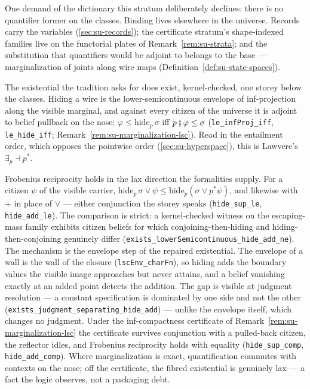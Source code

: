 One demand of the dictionary this stratum deliberately declines:
there is no quantifier former on the classes. Binding lives
elsewhere in the universe. Records carry the variables
(\autoref{sec:su-records}); the certificate stratum's
shape-indexed families live on the functorial plates of
Remark~\ref{rem:su-strata}; and the substitution that quantifiers
would be adjoint to belongs to the base --- marginalization of
joints along wire maps (Definition~\ref{def:su-state-spaces}).

The existential the tradition asks for does exist, kernel-checked,
one storey below the classes. Hiding a wire is the
lower-semicontinuous envelope of inf-projection along the visible
marginal, and against every citizen of the universe it is adjoint
to belief pullback on the nose:
$\varphi \le \mathrm{hide}_{p}\,\sigma$ iff
$p \fatsemi \varphi \le \sigma$ (\texttt{le\_infProj\_iff},
\texttt{le\_hide\_iff}; Remark~\ref{rem:su-marginalization-lsc}).
Read in the entailment order, which opposes the pointwise order
(\autoref{sec:su-hyperspace}), this is Lawvere's
$\exists_{p} \dashv p^{*}$.

Frobenius reciprocity holds in the lax direction the formalities
supply. For a citizen $\psi$ of the visible carrier,
$\mathrm{hide}_{p}\,\sigma \vee \psi \le
\mathrm{hide}_{p}(\sigma \vee p^{*}\psi)$, and likewise with $+$
in place of $\vee$ --- either conjunction the storey speaks
(\texttt{hide\_sup\_le}, \texttt{hide\_add\_le}). The comparison
is strict: a kernel-checked witness on the escaping-mass family
exhibits citizen beliefs for which conjoining-then-hiding and
hiding-then-conjoining genuinely differ
(\texttt{exists\_lowerSemicontinuous\_hide\_add\_ne}). The
mechanism is the envelope step of the repaired existential. The
envelope of a wall is the wall of the closure
(\texttt{lscEnv\_charFn}), so hiding adds the boundary values the
visible image approaches but never attains, and a belief
vanishing exactly at an added point detects the addition. The gap
is visible at judgment resolution --- a constant specification is
dominated by one side and not the other
(\texttt{exists\_judgment\_separating\_hide\_add}) --- unlike the
envelope itself, which changes no judgment. Under the
inf-compactness certificate of
Remark~\ref{rem:su-marginalization-lsc} the certificate survives
conjunction with a pulled-back citizen, the reflector idles, and
Frobenius reciprocity holds with equality
(\texttt{hide\_sup\_comp}, \texttt{hide\_add\_comp}). Where
marginalization is exact, quantification commutes with contexts on
the nose; off the certificate, the fibred existential is genuinely
lax --- a fact the logic observes, not a packaging debt.

